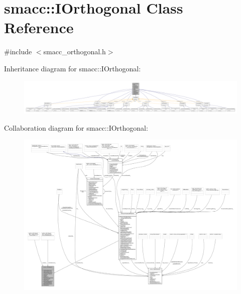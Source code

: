 \hypertarget{classsmacc_1_1IOrthogonal}{}\section{smacc\+:\+:I\+Orthogonal Class Reference}
\label{classsmacc_1_1IOrthogonal}


{\ttfamily \#include $<$smacc\+\_\+orthogonal.\+h$>$}



Inheritance diagram for smacc\+:\+:I\+Orthogonal\+:
\nopagebreak
\begin{figure}[H]
\begin{center}
\leavevmode
\includegraphics[width=350pt]{classsmacc_1_1IOrthogonal__inherit__graph}
\end{center}
\end{figure}


Collaboration diagram for smacc\+:\+:I\+Orthogonal\+:
\nopagebreak
\begin{figure}[H]
\begin{center}
\leavevmode
\includegraphics[width=350pt]{classsmacc_1_1IOrthogonal__coll__graph}
\end{center}
\end{figure}
